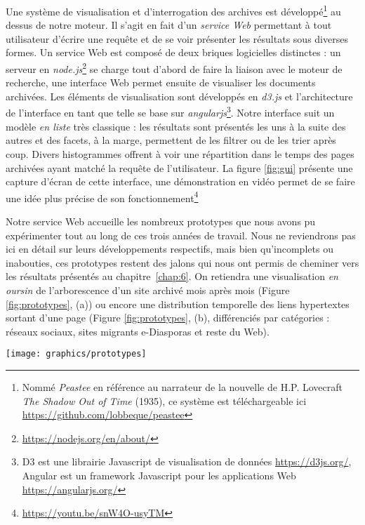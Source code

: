 \documentclass[symmetric,justified,marginals=raggedouter]{tufte-book}
\begin{document}
\noindent Une système de visualisation et d'interrogation des archives est dé\-veloppé\footnote{Nommé \textit{Peastee} en référence au narrateur de la nouvelle de H.P. Lovecraft \textit{The Shadow Out of Time} (1935), ce système est téléchargeable ici \url{https://github.com/lobbeque/peastee}} au dessus de notre moteur. Il s'agit en fait d'un \textit{service Web} permettant à tout utilisateur d'écrire une requête et de se voir présenter les résultats sous diverses formes. Un service Web est composé de deux briques logicielles distinctes : un serveur en \textit{node.js}\footnote{\url{https://nodejs.org/en/about/}} se charge tout d'abord de faire la liaison avec le moteur de recherche, une interface Web permet ensuite de visualiser les documents archivées. Les éléments de visualisation sont développés en \textit{d3.js} et l'architecture de l'interface en tant que telle se base sur \textit{angularjs}\footnote{D3 est une librairie Javascript de visualisation de données \url{https://d3js.org/}, Angular est un framework Javascript pour les applications Web \url{https://angularjs.org/}}. Notre interface suit un modèle \textit{en liste} très classique : les résultats sont présentés les uns à la suite des autres et des facets, à la marge, permettent de les filtrer ou de les trier après coup. Divers histogrammes offrent à voir une répartition dans le temps des pages archivées ayant matché la requête de l'utilisateur. La figure \ref{fig:gui} présente une capture d'écran de cette interface, une démonstration en vidéo permet de se faire une idée plus précise de son fonctionnement\footnote{\url{https://youtu.be/snW4O-usyTM}}

Notre service Web accueille les nombreux prototypes que nous avons pu expérimenter tout au long de ces trois années de travail. Nous ne reviendrons pas ici en détail sur leurs développements respectifs, mais bien qu'incomplets ou inabouties, ces prototypes restent des jalons qui nous ont permis de cheminer vers les résultats présentés au chapitre~\ref{chap:6}. On retiendra une visualisation \textit{en oursin} de l'arborescence d'un site archivé mois après mois (Figure \ref{fig:prototypes}, (a)) ou encore une distribution temporelle des liens hypertextes sortant d'une page (Figure \ref{fig:prototypes}, (b), différenciés par catégories : réseaux sociaux, sites migrants e-Diasporas et reste du Web). 

\begin{figure*}%
  \texttt{[image: graphics/prototypes]}
  \caption{Prototypes de visualisation d'archives Web}
  \label{fig:prototypes}
\end{figure*}
\end{document}
